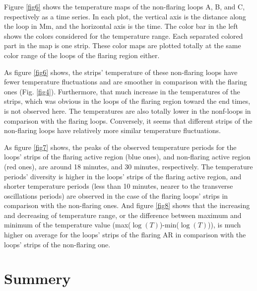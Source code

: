 \documentclass[oneside,onecolumn]{article}
\begin{document}
Figure \ref{fig6} shows the temperature maps of the non-flaring loops A, B, and C, respectively as a time series. In each plot, the vertical axis is the distance along the loop in Mm, and the horizontal axis is the time. The color bar in the left shows the colors considered for the temperature range. Each separated colored part in the map is one strip. These color maps are plotted totally at the same color range of the loops of the flaring region either. 

As figure \ref{fig6} shows, the strips' temperature of these non-flaring loops have fewer temperature fluctuations and are smoother in comparison with the flaring ones (Fig. \ref{fig4}). Furthermore, that much increase in the temperatures of the strips, which was obvious in the loops of the flaring region toward the end times, is not observed here. The temperatures are also totally lower in the nonf-loops in comparison with the flaring loops. Conversely, it seems that different strips of the non-flaring loops have relatively more similar temperature fluctuations.


As figure \ref{fig7} shows, the peaks of the observed temperature periods for the loops' strips of the flaring active region (blue ones), and non-flaring active region (red ones), are around 18 minutes, and 30 minutes, respectively. The temperature periods' diversity is higher in the loops'  strips of the flaring active region, and shorter temperature periods (less than 10 minutes, nearer to the transverse oscillations periods) are observed in the case of the flaring loops' strips in comparison with the non-flaring ones.  And figure \ref{fig8} shows that the increasing and decreasing of temperature range, or the difference between maximum and minimum of the temperature value (max($\log(T)$)-min($\log(T)$)), is much higher on average for the loops' strips of the flaring AR in comparison with the loops' strips of the non-flaring one.  

\section{Summery}   \label{sec:S}
\end{document}
